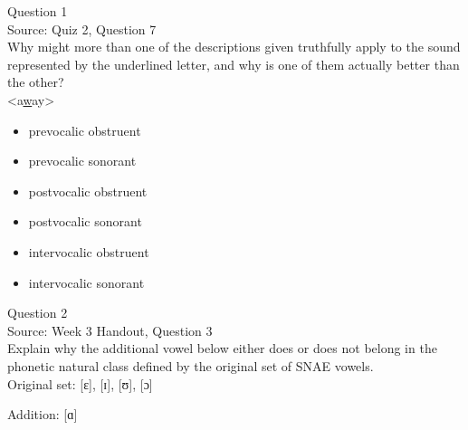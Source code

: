 \documentclass[12pt]{article}
\begin{document}
\begin{center}
\textbf{{\color{blue}{\HUGE START OF EXAM\\}}}

\textbf{{\color{blue}{\HUGE Student ID: 54125\\}}}

\textbf{{\color{blue}{\HUGE 4:50\\}}}

\end{center}
\newpage

{\large Question 1}\\

Source: Quiz 2, Question 7\\

Why might more than one of the descriptions given truthfully apply to the sound represented by the underlined letter, and why is one of them actually better than the other?\\

<a\underline{w}ay>

\begin{itemize} \item prevocalic obstruent \item prevocalic sonorant \item postvocalic obstruent \item postvocalic sonorant \item intervocalic obstruent \item intervocalic sonorant \end{itemize}


\newpage

{\large Question 2}\\

Source: Week 3 Handout, Question 3\\

Explain why the additional vowel below either does or does not belong in the phonetic natural class defined by the original set of SNAE vowels.\\

Original set: {[ɛ]}, {[ɪ]}, {[ʊ]}, {[ɔ]}

Addition: {[ɑ]}


\newpage

\begin{center}
\textbf{{\color{red}{\HUGE END OF EXAM}}}\\

\end{center}
\newpage
\end{document}
